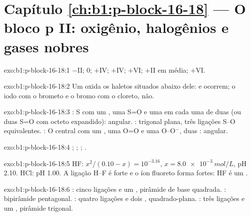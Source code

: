\section*{Capítulo \ref{ch:b1:p-block-16-18} --- O bloco p II: oxigênio, halogênios e gases nobres}

\begin{solution}{exo:b1:p-block-16-18:1}
 $-$II;  0;  $+$IV;  $+$IV; 
$+$VI;  $+$II em média;  $+$VI.
\end{solution}

\begin{solution}{exo:b1:p-block-16-18:2}
Um  oxida os haletos situados abaixo dele:  e
 ocorrem; o iodo com o brometo e o bromo com
o cloreto, não.
\end{solution}

\begin{solution}{exo:b1:p-block-16-18:3}
: S com um , uma S=O e uma  em cada uma
de duas  (ou duas S=O com octeto expandido):
angular. : trigonal plana, três ligações S--O equivalentes.
: O central com um , uma O=O e uma O--O$^-$, duas
: angular.
\end{solution}

\begin{solution}{exo:b1:p-block-16-18:4}
; ;
; .
\end{solution}

\begin{solution}{exo:b1:p-block-16-18:5}
HF: $x^2/(0.10 - x) = 10^{-3.16}$, $x = \qty{8.0e-3}{mol/L}$, pH 2.10. HCl:
pH 1.00. A ligação H--F é forte e o íon fluoreto forma  fortes: HF é um .
\end{solution}

\begin{solution}{exo:b1:p-block-16-18:6}
: cinco ligações e um , pirâmide de base
quadrada. : bipirâmide pentagonal. : quatro ligações e
dois , quadrado-plana. : três ligações e um , pirâmide trigonal.
\end{solution}

